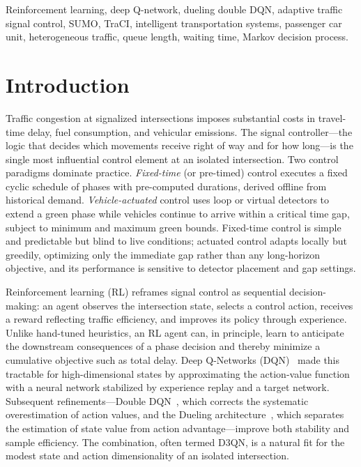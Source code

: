 \documentclass[conference]{IEEEtran}
\begin{document}
\begin{IEEEkeywords}
Reinforcement learning, deep Q-network, dueling double DQN, adaptive traffic
signal control, SUMO, TraCI, intelligent transportation systems, passenger car
unit, heterogeneous traffic, queue length, waiting time, Markov decision process.
\end{IEEEkeywords}

\section{Introduction}
Traffic congestion at signalized intersections imposes substantial costs in
travel-time delay, fuel consumption, and vehicular emissions. The signal
controller---the logic that decides which movements receive right of way and for
how long---is the single most influential control element at an isolated
intersection. Two control paradigms dominate practice. \emph{Fixed-time} (or
pre-timed) control executes a fixed cyclic schedule of phases with pre-computed
durations, derived offline from historical demand. \emph{Vehicle-actuated}
control uses loop or virtual detectors to extend a green phase while vehicles
continue to arrive within a critical time gap, subject to minimum and maximum
green bounds. Fixed-time control is simple and predictable but blind to live
conditions; actuated control adapts locally but greedily, optimizing only the
immediate gap rather than any long-horizon objective, and its performance is
sensitive to detector placement and gap settings.

Reinforcement learning (RL) reframes signal control as sequential
decision-making: an agent observes the intersection state, selects a control
action, receives a reward reflecting traffic efficiency, and improves its policy
through experience. Unlike hand-tuned heuristics, an RL agent can, in principle,
learn to anticipate the downstream consequences of a phase decision and thereby
minimize a cumulative objective such as total delay. Deep Q-Networks
(DQN)~\cite{mnih2015} made this tractable for high-dimensional states by
approximating the action-value function with a neural network stabilized by
experience replay and a target network. Subsequent refinements---Double
DQN~\cite{vanhasselt2016}, which corrects the systematic overestimation of
action values, and the Dueling architecture~\cite{wang2016}, which separates the
estimation of state value from action advantage---improve both stability and
sample efficiency. The combination, often termed D3QN, is a natural fit for the
modest state and action dimensionality of an isolated intersection.
\end{document}
